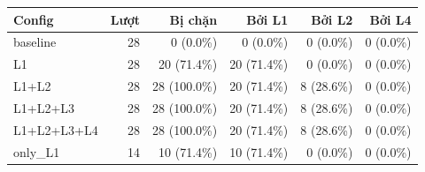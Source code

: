 \begin{tabular}{lrrrrr}
\toprule
Config & Lượt & Bị chặn & Bởi L1 & Bởi L2 & Bởi L4 \\
\midrule
baseline & 28 & 0 (0.0\%) & 0 (0.0\%) & 0 (0.0\%) & 0 (0.0\%) \\
L1 & 28 & 20 (71.4\%) & 20 (71.4\%) & 0 (0.0\%) & 0 (0.0\%) \\
L1+L2 & 28 & 28 (100.0\%) & 20 (71.4\%) & 8 (28.6\%) & 0 (0.0\%) \\
L1+L2+L3 & 28 & 28 (100.0\%) & 20 (71.4\%) & 8 (28.6\%) & 0 (0.0\%) \\
L1+L2+L3+L4 & 28 & 28 (100.0\%) & 20 (71.4\%) & 8 (28.6\%) & 0 (0.0\%) \\
only\_L1 & 14 & 10 (71.4\%) & 10 (71.4\%) & 0 (0.0\%) & 0 (0.0\%) \\
\bottomrule
\end{tabular}
